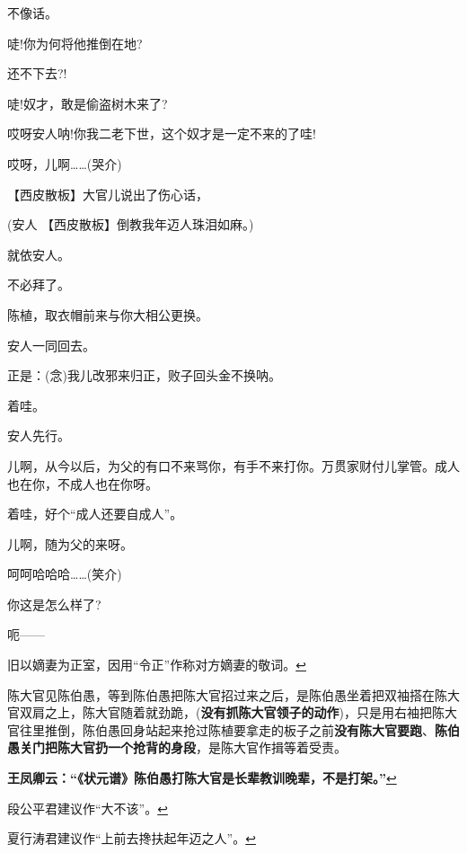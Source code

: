 不像话。

唗!你为何将他推倒在地?

还不下去?!

唗!奴才，敢是偷盗树木来了?

哎呀安人呐!你我二老下世，这个奴才是一定不来的了哇!

哎呀，儿啊\ldots{}\ldots{}(哭介)

【西皮散板】大官儿说出了伤心话，

(安人 【西皮散板】倒教我年迈人珠泪如麻。)

就依安人。

不必拜了。

陈植，取衣帽前来与你大相公更换。

安人一同回去。

正是：(念)我儿改邪来归正，败子回头金不换呐。

着哇。

安人先行。

儿啊，从今以后，为父的有口不来骂你，有手不来打你。万贯家财付儿掌管。成人也在你，不成人也在你呀。

着哇，好个``成人还要自成人''。

儿啊，随为父的来呀。

呵呵哈哈哈\ldots{}\ldots{}(笑介)

你这是怎么样了?

呃------

  \leavevmode\hypertarget{fn625}{}%
  旧以嫡妻为正室，因用``令正''作称对方嫡妻的敬词。\protect\hyperlink{fnref625}{↩}
\item
  \leavevmode\hypertarget{fn626}{}%
  陈大官见陈伯愚，等到陈伯愚把陈大官招过来之后，是陈伯愚坐着把双袖搭在陈大官双肩之上，陈大官随着就劲跪，(\textbf{没有抓陈大官领子的动作})，只是用右袖把陈大官往里推倒，陈伯愚回身站起来抢过陈植要拿走的板子之前\textbf{没有陈大官要跑}、\textbf{陈伯愚关门把陈大官扔一个抢背的身段}，是陈大官作揖等着受责。

  \textbf{王凤卿云：``《状元谱》陈伯愚打陈大官是长辈教训晚辈，不是打架。''}\protect\hyperlink{fnref626}{↩}
\item
  \leavevmode\hypertarget{fn627}{}%
  段公平君建议作``大不该''。\protect\hyperlink{fnref627}{↩}
\item
  \leavevmode\hypertarget{fn628}{}%
  夏行涛君建议作``上前去搀扶起年迈之人''。\protect\hyperlink{fnref628}{↩}
